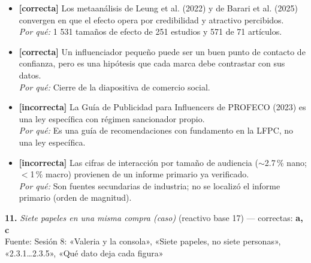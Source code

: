 \documentclass[10pt,letterpaper]{article}
\begin{document}
\begin{itemize}[leftmargin=1.2em,itemsep=0pt,topsep=1pt,parsep=0pt]
\item[\textbf{a)}] {\footnotesize \textbf{[correcta]} Los metaanálisis de Leung et al. (2022) y de Barari et al. (2025) convergen en que el efecto opera por credibilidad y atractivo percibidos.\\ \textit{Por qué:} 1 531 tamaños de efecto de 251 estudios y 571 de 71 artículos.}
\item[\textbf{b)}] {\footnotesize \textbf{[correcta]} Un influenciador pequeño puede ser un buen punto de contacto de confianza, pero es una hipótesis que cada marca debe contrastar con sus datos.\\ \textit{Por qué:} Cierre de la diapositiva de comercio social.}
\item[\textbf{c)}] {\footnotesize \textbf{[incorrecta]} La Guía de Publicidad para Influencers de PROFECO (2023) es una ley específica con régimen sancionador propio.\\ \textit{Por qué:} Es una guía de recomendaciones con fundamento en la LFPC, no una ley específica.}
\item[\textbf{d)}] {\footnotesize \textbf{[incorrecta]} Las cifras de interacción por tamaño de audiencia (${\sim}$2.7\,\% nano; $<$1\,\% macro) provienen de un informe primario ya verificado.\\ \textit{Por qué:} Son fuentes secundarias de industria; no se localizó el informe primario (orden de magnitud).}
\end{itemize}
\vspace{3pt}\noindent\textbf{11.} \textit{Siete papeles en una misma compra (caso)} (reactivo base 17) — correctas: \textbf{a, c}\\[-1pt]
{\scriptsize Fuente: Sesión 8: «Valeria y la consola», «Siete papeles, no siete personas», «2.3.1…2.3.5», «Qué dato deja cada figura»}
\end{document}
